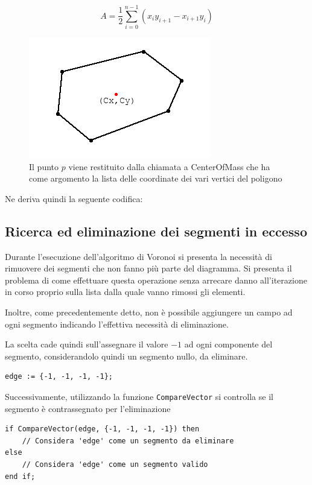 \documentclass[10pt,a4paper]{article}
\newcommand{\modelicaclass}[1]{

}
\newcommand{\name}[1]{{\color{purple}#1}}
\begin{document}
\[
A = \frac{1}{2} \sum_{i=0}^{n-1} (x_i y_{i+1} - x_{i+1} y_i)
\]

\begin{figure}[H]
\centering
\includegraphics[scale=0.6]{CenterOfMass.png}
\caption{Il punto $p$ viene restituito dalla chiamata a \name{CenterOfMass} che ha come argomento la lista delle coordinate dei vari vertici del poligono}
\end{figure}

Ne deriva quindi la seguente codifica:

\modelicaclass{CenterOfMass.mo}

\subsection{Ricerca ed eliminazione dei segmenti in eccesso}

Durante l'esecuzione dell'algoritmo di Voronoi si presenta la necessità di rimuovere dei segmenti che non fanno più parte del diagramma. Si presenta il problema di come effettuare questa operazione senza arrecare danno all'iterazione in corso proprio sulla lista dalla quale vanno rimossi gli elementi.

Inoltre, come precedentemente detto, non è possibile aggiungere un campo ad ogni segmento indicando l'effettiva necessità di eliminazione.

La scelta cade quindi sull'assegnare il valore $-1$ ad ogni componente del segmento, considerandolo quindi un segmento nullo, da eliminare.

\begin{lstlisting}[language=Modelica]
edge := {-1, -1, -1, -1};
\end{lstlisting}

Successivamente, utilizzando la funzione \verb|CompareVector| si controlla se il segmento è contrassegnato per l'eliminazione

\begin{lstlisting}
if CompareVector(edge, {-1, -1, -1, -1}) then
	// Considera 'edge' come un segmento da eliminare
else
	// Considera 'edge' come un segmento valido
end if;
\end{lstlisting}
\end{document}
